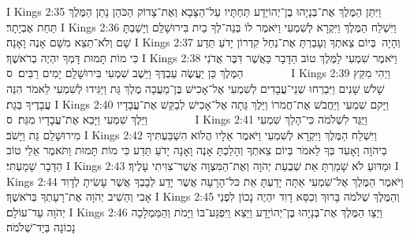 I Kings 2:35	וַיִּתֵּן הַמֶּלֶךְ אֶת־בְּנָיָהוּ בֶן־יְהוֹיָדָע תַּחְתָּיו עַל־הַצָּבָא וְאֶת־צָדוֹק הַכֹּהֵן נָתַן הַמֶּלֶךְ תַּחַת אֶבְיָתָר׃
I Kings 2:36	וַיִּשְׁלַח הַמֶּלֶךְ וַיִּקְרָא לְשִׁמְעִי וַיֹּאמֶר לוֹ בְּנֵה־לְךָ בַיִת בִּירוּשָׁלַ͏ִם וְיָשַׁבְתָּ שָׁם וְלֹא־תֵצֵא מִשָּׁם אָנֶה וָאָנָה׃
I Kings 2:37	וְהָיָה  בְּיוֹם צֵאתְךָ וְעָבַרְתָּ אֶת־נַחַל קִדְרוֹן יָדֹעַ תֵּדַע כִּי מוֹת תָּמוּת דָּמְךָ יִהְיֶה בְרֹאשֶׁךָ׃
I Kings 2:38	וַיֹּאמֶר שִׁמְעִי לַמֶּלֶךְ טוֹב הַדָּבָר כַּאֲשֶׁר דִּבֶּר אֲדֹנִי הַמֶּלֶךְ כֵּן יַעֲשֶׂה עַבְדֶּךָ וַיֵּשֶׁב שִׁמְעִי בִּירוּשָׁלַ͏ִם יָמִים רַבִּים׃ {ס}        
I Kings 2:39	וַיְהִי מִקֵּץ שָׁלֹשׁ שָׁנִים וַיִּבְרְחוּ שְׁנֵי־עֲבָדִים לְשִׁמְעִי אֶל־אָכִישׁ בֶּן־מַעֲכָה מֶלֶךְ גַּת וַיַּגִּידוּ לְשִׁמְעִי לֵאמֹר הִנֵּה עֲבָדֶיךָ בְּגַת׃
I Kings 2:40	וַיָּקם שִׁמְעִי וַיַּחֲבֹשׁ אֶת־חֲמֹרוֹ וַיֵּלֶךְ גַּתָה אֶל־אָכִישׁ לְבַקֵּשׁ אֶת־עֲבָדָיו וַיֵּלֶךְ שִׁמְעִי וַיָּבֵא אֶת־עֲבָדָיו מִגַּת׃ {ס}        
I Kings 2:41	וַיֻּגַּד לִשְׁלֹמֹה כִּי־הָלַךְ שִׁמְעִי מִירוּשָׁלַ͏ִם גַּת וַיָּשֹׁב׃
I Kings 2:42	וַיִּשְׁלַח הַמֶּלֶךְ וַיִּקְרָא לְשִׁמְעִי וַיֹּאמֶר אֵלָיו הֲלוֹא הִשְׁבַּעְתִּיךָ בַיהֹוָה וָאָעִד בְּךָ לֵאמֹר בְּיוֹם צֵאתְךָ וְהָלַכְתָּ אָנֶה וָאָנָה יָדֹעַ תֵּדַע כִּי מוֹת תָּמוּת וַתֹּאמֶר אֵלַי טוֹב הַדָּבָר שָׁמָעְתִּי׃
I Kings 2:43	וּמַדּוּעַ לֹא שָׁמַרְתָּ אֵת שְׁבֻעַת יְהֹוָה וְאֶת־הַמִּצְוָה אֲשֶׁר־צִוִּיתִי עָלֶיךָ׃
I Kings 2:44	וַיֹּאמֶר הַמֶּלֶךְ אֶל־שִׁמְעִי אַתָּה יָדַעְתָּ אֵת כּל־הָרָעָה אֲשֶׁר יָדַע לְבָבְךָ אֲשֶׁר עָשִׂיתָ לְדָוִד אָבִי וְהֵשִׁיב יְהֹוָה אֶת־רָעָתְךָ בְּרֹאשֶׁךָ׃
I Kings 2:45	וְהַמֶּלֶךְ שְׁלֹמֹה בָּרוּךְ וְכִסֵּא דָוִד יִהְיֶה נָכוֹן לִפְנֵי יְהֹוָה עַד־עוֹלָם׃
I Kings 2:46	וַיְצַו הַמֶּלֶךְ אֶת־בְּנָיָהוּ בֶּן־יְהוֹיָדָע וַיֵּצֵא וַיִּפְגַּע־בּוֹ וַיָּמֹת וְהַמַּמְלָכָה נָכוֹנָה בְּיַד־שְׁלֹמֹה׃
